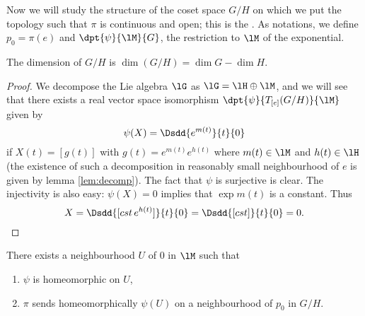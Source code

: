 Now we will study the structure of the coset space $G/H$ on which we put the topology such that $\pi$ is continuous and open; this is the \label{pg:natur_topo}. As notations, we define $p_0=\pi(e)$ and $\dpt{\psi}{\lM}{G}$, the restriction to $\lM$ of the exponential.

\begin{lemma}
The dimension of $G/H$ is $\dim (G/H)=\dim G-\dim H$.
 \label{lem:dim_G_H}
\end{lemma}

\begin{proof}
We decompose the Lie algebra $\lG$ as $\lG=\lH\oplus\lM$, and we will see that there exists a real vector space isomorphism $\dpt{\psi}{T_{[e]}(G/H)}{\lM}$ given by
\begin{equation}
   \psi(X)=\Dsdd{ e^{m(t)} }{t}{0}
\end{equation}
if $X(t)=[g(t)]$ with $g(t)=e^{m(t)}e^{h(t)}$ where $m(t)\in\lM$ and $h(t)\in\lH$ (the existence of such a decomposition in reasonably small neighbourhood of $e$ is given by lemma \ref{lem:decomp}). The fact that $\psi$ is surjective is clear. The injectivity is also easy: $\psi(X)=0$ implies that $\exp m(t)$ is a constant. Thus
\[
X=\Dsdd{ [cst\, e^{h(t)}] }{t}{0}=\Dsdd{[cst]}{t}{0}=0.
\]

\end{proof}

\begin{lemma} \label{lem:vois_U}
There exists a neighbourhood $U$ of $0$ in $\lM$ such that
 \begin{enumerate}
 \item $\psi$ is homeomorphic on $U$,
 \item $\pi$ sends homeomorphically $\psi(U)$ on a neighbourhood of $p_0$ in $G/H$.
 \end{enumerate}
\end{lemma}

